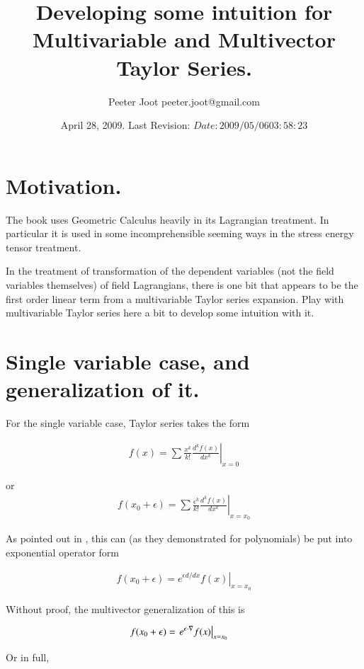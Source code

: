 \documentclass{article}
\title{ Developing some intuition for Multivariable and Multivector Taylor Series. }
\author{Peeter Joot \quad peeter.joot@gmail.com }
\date{ April 28, 2009.  Last Revision: $Date: 2009/05/06 03:58:23 $ }
\begin{document}
\maketitle{}
\tableofcontents
\section{ Motivation. }

The book \cite{doran2003gap} uses Geometric Calculus heavily in its 
Lagrangian treatment.  In particular it is used in some incomprehensible seeming ways in the 
stress energy tensor treatment.

In the treatment of transformation of the dependent variables (not the field
variables themselves) of field Lagrangians, there is one bit that
appears to be the first order linear term from a multivariable Taylor
series expansion.  Play with multivariable Taylor series here a bit
to develop some intuition with it.

\section{ Single variable case, and generalization of it. }

For the single variable case, Taylor series takes the form

\begin{align}
f(x) = \sum \frac{x^k}{k!} \left. \frac{d^k f(x)}{dx^k} \right\vert_{x=0}
\end{align}

or
\begin{align}
f(x_0 + \epsilon) = \sum \frac{\epsilon^k}{k!} \left. \frac{d^k f(x)}{dx^k} \right\vert_{x=x_0}
\end{align}

As pointed out in \cite{byron1992mca}, this can (as they demonstrated for polynomials) be put into exponential 
operator form

\begin{align}
f(x_0 + \epsilon) = \left. e^{\epsilon d/dx} f(x) \right\vert_{x=x_0}
\end{align}

Without proof, the multivector generalization of this is

\begin{align}\label{eqn:taylorsExponential}
f(x_0 + \epsilon) 
&= \left. e^{\epsilon \cdot \nabla} f(x) \right\vert_{x=x_0} 
\end{align}

Or in full,
\end{document}
